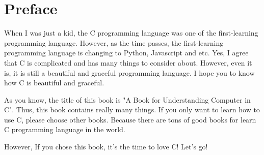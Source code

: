 \chapter{Preface}
When I was just a kid, the C programming language was one of the first-learning
programming language. However, as the time passes, the first-learning
programming language is changing to Python, Javascript and etc. Yes, I agree
that C is complicated and has many things to consider about. However, even it
is, it is still a beautiful and graceful programming language. I hope you to
know how C is beautiful and graceful.

As you know, the title of this book is "A Book for Understanding Computer in C".
Thus, this book contains really many things. If you only want to learn how to
use C, please choose other books. Because there are tons of good books for learn
C programming language in the world.

However, If you chose this book, it’s the time to love C! Let’s go!

